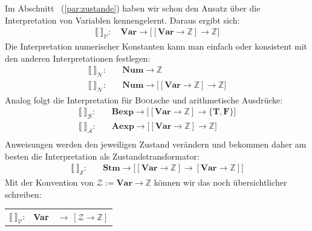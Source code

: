 \documentclass[
  a4paper,
  11pt,
]{scrartcl}
\newcommand{\Z}{\mathbb{Z}}
\newcommand{\Ac}{\mathcal{A}}
\newcommand{\Bc}{\mathcal{B}}
\newcommand{\Nc}{\mathcal{N}}
\newcommand{\Sc}{\mathcal{S}}
\newcommand{\Vc}{\mathcal{V}}
\newcommand{\Zc}{\mathcal{Z}}
\begin{document}
\begin{itemize}
    Im Abschnitt~ (\ref{par:zustande}) haben wir schon den
    Ansatz über die Interpretation von Variablen kennengelernt. Daraus ergibt
    sich:
    \begin{align*}
      \llbracket \ \rrbracket_{\Vc}: \quad
        \textbf{Var} \rightarrow
          \big[
            \left[ \textbf{Var} \rightarrow \Z \right]
            \rightarrow \Z
          \big]
    \end{align*}
    Die Interpretation numerischer Konstanten kann man einfach oder konsistent
    mit den anderen Interpretationen festlegen:
    \begin{align*}
      \llbracket \ \rrbracket_{\Nc}: \quad &
        \textbf{Num} \rightarrow \Z\\
      \llbracket \ \rrbracket_{\Nc}: \quad &
        \textbf{Num} \rightarrow
          \big[
            \left[ \textbf{Var} \rightarrow \Z \right]
            \rightarrow \Z
          \big]
    \end{align*}
    Analog folgt die Interpretation für \textsc{Bool}sche und arithmetische
    Ausdrücke:
    \begin{align*}
      \llbracket \ \rrbracket_{\Bc}: \quad &
        \textbf{Bexp} \rightarrow
          \big[
            \left[ \textbf{Var} \rightarrow \Z \right]
            \rightarrow \{ \textbf{T}, \textbf{F} \}
          \big]\\
      \llbracket \ \rrbracket_{\Ac}: \quad &
        \textbf{Aexp} \rightarrow
          \big[
            \left[ \textbf{Var} \rightarrow \Z \right]
            \rightarrow \Z
          \big]\\
    \end{align*}
    Anweisungen werden den jeweiligen Zustand verändern und bekommen daher am
    besten die Interpretation als Zustandstransformator:
    \begin{align*}
      \llbracket \ \rrbracket_{\Sc}: \quad &
        \textbf{Stm} \rightarrow
          \big[
            \left[ \textbf{Var} \rightarrow \Z \right]
            \rightarrow
            \left[ \textbf{Var} \rightarrow \Z \right]
          \big]
    \end{align*}
    Mit der Konvention von $\Zc := \textbf{Var} \rightarrow \Z$ können wir das
    noch übersichtlicher schreiben:
    \begin{center}
      \begin{tabular}{lll}
        $\llbracket \ \rrbracket_{\Vc}$:
        & \textbf{Var}
        & $\rightarrow \ \left[ \Zc \rightarrow \Z \right]$\\

\end{tabular}
\end{center}
\end{itemize}
\end{document}
